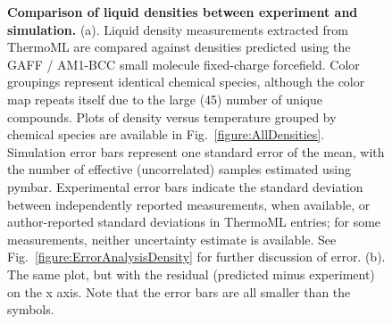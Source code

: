 \documentclass[journal=jacsat,manuscript=article]{achemso}
\begin{document}
\begin{figure}



\caption{{\bf Comparison of liquid densities between experiment and simulation.}
(a).  Liquid density measurements extracted from ThermoML are compared against densities predicted using the GAFF / AM1-BCC small molecule fixed-charge forcefield.
Color groupings represent identical chemical species, although the color map repeats itself due to the large (45) number of unique compounds.
Plots of density versus temperature grouped by chemical species are available in Fig.~\ref{figure:AllDensities}.
Simulation error bars represent one standard error of the mean, with the number of effective (uncorrelated) samples estimated using pymbar.  
Experimental error bars indicate the standard deviation between independently reported measurements, when available, or author-reported standard deviations in ThermoML entries; for some measurements, neither uncertainty estimate is available.  
See Fig.~\ref{figure:ErrorAnalysisDensity} for further discussion of error.  (b).  The same plot, but with the residual (predicted minus experiment) on the x axis.  Note that the error bars are all smaller than the symbols.  
}
\label{figure:Density}
\end{figure}
\end{document}
